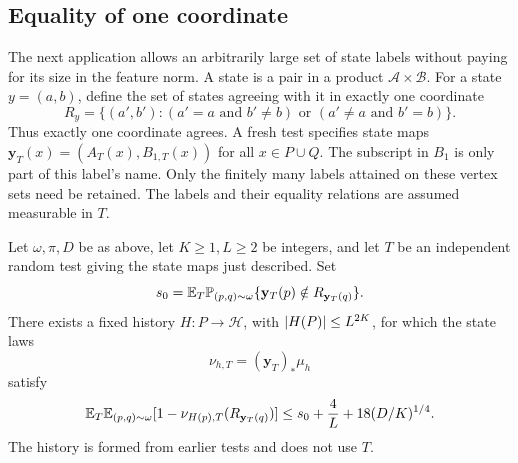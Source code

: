\subsection{Equality of one coordinate}

The next application allows an arbitrarily large set of state labels without
paying for its size in the feature norm.  A state is a pair in a product
\(\mathcal A\times\mathcal B\).  For a state \(y=(a,b)\), define the set of states agreeing with it in exactly one coordinate
\begin{equation}\label{pred:strict-cross}
 R_y=\{(a',b'):
           (a'=a\text{ and }b'\ne b)
           \text{ or }(a'\ne a\text{ and }b'=b)\}.
\end{equation}
Thus exactly one coordinate agrees.  A fresh test specifies state maps
\(\mathbf y_T(x)=(A_T(x),B_{1,T}(x))\) for all \(x\in P\cup Q\).
The subscript in \(B_1\) is only part of this label's name.
Only the finitely many labels attained on these vertex sets need be retained.
The labels and their equality relations are assumed measurable in \(T\).

\begin{corollary}\label{pred:cross}
Let \(\omega,\pi,D\) be as above, let \(K\ge1,L\ge2\) be integers, and
let \(T\) be an independent random test giving the state maps just described.
Set
\[
 s_0=\mathbb E_T\mathbb P_{(p,q)\sim\omega}
                       \{\mathbf y_T(p)\notin R_{\mathbf y_T(q)}\}.
\]
There exists a fixed history \(H:P\to\mathcal H\), with
\(\lvert H(P)\rvert\le L^{2K}\), for which the state laws
\[
 \nu_{h,T}=(\mathbf y_T)_*\mu_h
\]
satisfy
\begin{equation}\label{pred:cross-bound}
 \mathbb E_T\mathbb E_{(p,q)\sim\omega}
       [1-\nu_{H(p),T}(R_{\mathbf y_T(q)})]
 \le s_0+\frac4L+18(D/K)^{1/4}.
\end{equation}
The history is formed from earlier tests and does not use \(T\).
\end{corollary}

